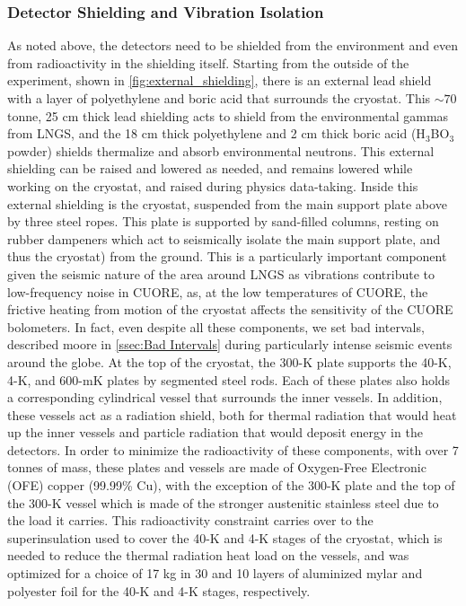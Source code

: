 \subsubsection*{Detector Shielding and Vibration Isolation}
As noted above, the detectors need to be shielded from the environment and even from radioactivity in the shielding itself.
Starting from the outside of the experiment, shown in \autoref{fig:external_shielding}, there is an external lead shield with a layer of polyethylene and boric acid that surrounds the cryostat.
This $\sim70$ tonne, 25 cm thick lead shielding acts to shield from the environmental gammas from LNGS, and the 18 cm thick polyethylene and 2 cm thick boric acid (H$_3$BO$_3$ powder) shields thermalize and absorb environmental neutrons.
This external shielding can be raised and lowered as needed, and remains lowered while working on the cryostat, and raised during physics data-taking.
Inside this external shielding is the cryostat, suspended from the main support plate above by three steel ropes.
This plate is supported by sand-filled columns, resting on rubber dampeners which act to seismically isolate the main support plate, and thus the cryostat) from the ground.
This is a particularly important component given the seismic nature of the area around LNGS as vibrations contribute to low-frequency noise in CUORE, as, at the low temperatures of CUORE, the frictive heating from motion of the cryostat affects the sensitivity of the CUORE bolometers.
In fact, even despite all these components, we set bad intervals, described moore in \autoref{ssec:Bad Intervals} during particularly intense seismic events around the globe.
At the top of the cryostat, the 300-K plate supports the 40-K, 4-K, and 600-mK plates by segmented steel rods.
Each of these plates also holds a corresponding cylindrical vessel that surrounds the inner vessels.
In addition, these vessels act as a radiation shield, both for thermal radiation that would heat up the inner vessels and particle radiation that would deposit energy in the detectors.
In order to minimize the radioactivity of these components, with over 7 tonnes of mass, these plates and vessels are made of Oxygen-Free Electronic (OFE) copper (99.99\% Cu), with the exception of the 300-K plate and the top of the 300-K vessel which is made of the stronger austenitic stainless steel due to the load it carries.
This radioactivity constraint carries over to the superinsulation used to cover the 40-K and 4-K stages of the cryostat, which is needed to reduce the thermal radiation heat load on the vessels, and was optimized for a choice of 17 kg in 30 and 10 layers of aluminized mylar and polyester foil for the 40-K and 4-K stages, respectively.

